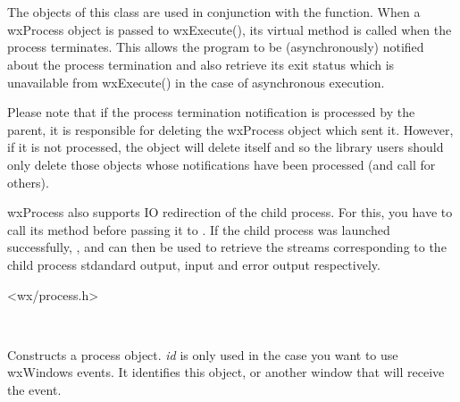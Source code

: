 \section{}\label{wxprocess}

The objects of this class are used in conjunction with the 
 function. When a wxProcess object is passed to
wxExecute(), its  virtual method
is called when the process terminates. This allows the program to be
(asynchronously) notified about the process termination and also retrieve its
exit status which is unavailable from wxExecute() in the case of
asynchronous execution.

Please note that if the process termination notification is processed by the
parent, it is responsible for deleting the wxProcess object which sent it.
However, if it is not processed, the object will delete itself and so the
library users should only delete those objects whose notifications have been
processed (and call  for others).

wxProcess also supports IO redirection of the child process. For this, you have
to call its  method before passing it to 
. If the child process was launched successfully, 
, 
 and 
 can then be used to retrieve
the streams corresponding to the child process stdandard output, input and
error output respectively.




<wx/process.h>


\\


\label{wxprocessconstr}


Constructs a process object. {\it id} is only used in the case you want to
use wxWindows events. It identifies this object, or another window that will
receive the event.

